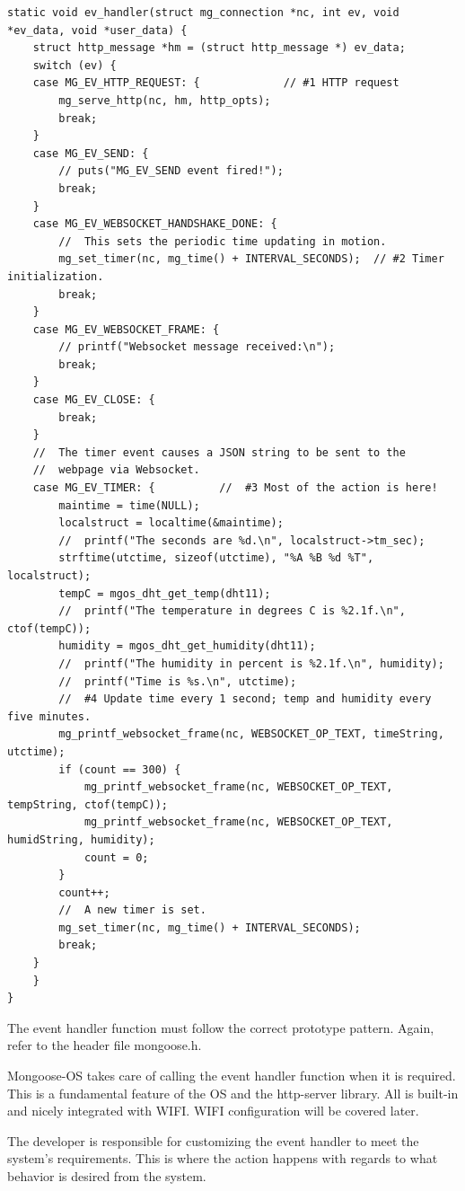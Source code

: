 \documentclass[oneside,letterpaper,12pt]{book}
\begin{document}
\begin{verbatim}
static void ev_handler(struct mg_connection *nc, int ev, void *ev_data, void *user_data) {
    struct http_message *hm = (struct http_message *) ev_data;
    switch (ev) {
    case MG_EV_HTTP_REQUEST: {             // #1 HTTP request
        mg_serve_http(nc, hm, http_opts);
        break;
    }
    case MG_EV_SEND: {
        // puts("MG_EV_SEND event fired!");
        break;
    }
    case MG_EV_WEBSOCKET_HANDSHAKE_DONE: {
        //  This sets the periodic time updating in motion.
        mg_set_timer(nc, mg_time() + INTERVAL_SECONDS);  // #2 Timer initialization.
        break;
    }
    case MG_EV_WEBSOCKET_FRAME: {
        // printf("Websocket message received:\n");
        break;
    }
    case MG_EV_CLOSE: {
        break;
    }
    //  The timer event causes a JSON string to be sent to the
    //  webpage via Websocket.
    case MG_EV_TIMER: {          //  #3 Most of the action is here!
        maintime = time(NULL);
        localstruct = localtime(&maintime);
        //  printf("The seconds are %d.\n", localstruct->tm_sec);
        strftime(utctime, sizeof(utctime), "%A %B %d %T", localstruct);
        tempC = mgos_dht_get_temp(dht11);
        //  printf("The temperature in degrees C is %2.1f.\n", ctof(tempC));
        humidity = mgos_dht_get_humidity(dht11);
        //  printf("The humidity in percent is %2.1f.\n", humidity);
        //  printf("Time is %s.\n", utctime);
        //  #4 Update time every 1 second; temp and humidity every five minutes.
        mg_printf_websocket_frame(nc, WEBSOCKET_OP_TEXT, timeString, utctime);
        if (count == 300) {
            mg_printf_websocket_frame(nc, WEBSOCKET_OP_TEXT, tempString, ctof(tempC));
            mg_printf_websocket_frame(nc, WEBSOCKET_OP_TEXT, humidString, humidity);
            count = 0;
        }
        count++;
        //  A new timer is set.
        mg_set_timer(nc, mg_time() + INTERVAL_SECONDS);
        break;
    }
    }
}
\end{verbatim}

The event handler function must follow the correct prototype pattern.
Again, refer to the header file mongoose.h.

Mongoose-OS takes care of calling the event handler function when it is
required. This is a fundamental feature of the OS and the http-server
library. All is built-in and nicely integrated with WIFI. WIFI
configuration will be covered later.

The developer is responsible for customizing the event handler to meet
the system's requirements. This is where the action happens with regards
to what behavior is desired from the system.
\end{document}
